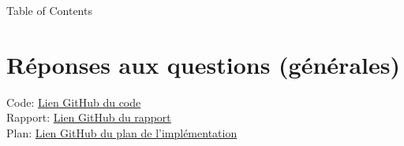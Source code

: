 \documentclass[french]{beamer}
\begin{document}
\frame{\titlepage}
\begin{frame}{Table of Contents}

\tableofcontents
\end{frame}


%
%








%
%
\section{Réponses aux questions (générales)}
\begin{frame}{\secname}

Code: {\small \href{https://github.com/David-Kyrat/12X009-OS-TPs/tree/master/TP06}{Lien GitHub du code} }\\

Rapport: {\small 
    \href{https://github.com/David-Kyrat/12X009-OS-TPs/blob/master/TP06/instructions-report/TP06-rapport.pdf}{Lien GitHub du rapport}
    }\\
Plan: {\small
 \href{https://github.com/David-Kyrat/12X009-OS-TPs/blob/master/TP06/instructions-report/HOWTO.md}{Lien GitHub du plan de l'implémentation}
}

\end{frame}
\end{document}
